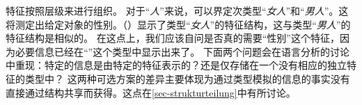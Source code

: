 特征按照层级来进行组织。
对于“\textit{人}”来说，可以界定次类型“\textit{女人}”和“\textit{男人}”。这将测定出给定对象的性别。（）显示了类型“\textit{女人}”的特征结构，这与类型“\textit{男人}”的特征结构是相似的。
\ea
{}
\z
在这点上，我们应该自问是否真的需要“\textsc{性别}”这个特征，因为必要信息已经在“”这个类型中显示出来了。
下面两个问题会在语言分析的讨论中重现：特定的信息是由特定的特征表示的？还是仅存储在一个没有相应的独立特征的类型中？
这两种可选方案的差异主要体现为通过类型模拟的信息的事实没有直接通过结构共享而获得。这点在\ref{sec-strukturteilung}中有所讨论。


